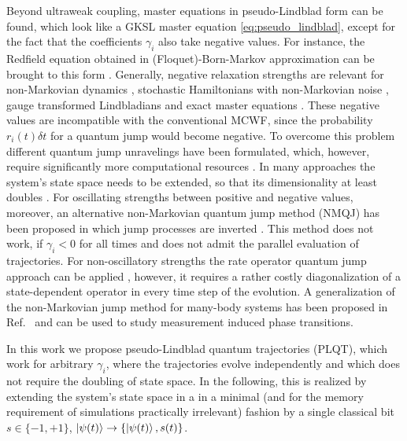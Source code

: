 \documentclass[twocolumn,prl,superscriptaddress]{revtex4-2}
\begin{document}
Beyond ultraweak coupling, master equations in pseudo-Lindblad form can be found, which look like a GKSL master equation \cref{eq:pseudo_lindblad}, except for the fact that the coefficients $\gamma_i$ also take negative values. For instance, the Redfield equation obtained in (Floquet)-Born-Markov approximation can be brought to this form \cite{TBecker2021}. Generally, negative relaxation strengths are relevant for non-Markovian dynamics \cite{DCruscinskiJPiiloWStrunz2017}, stochastic Hamiltonians with non-Markovian noise \cite{Groszkowski2022}, gauge transformed Lindbladians \cite{McDonaldClerk2023arxiv} and exact master equations \cite{KarrleinGrabert97,AShajiECGSudarshan2005,SAlipour2020}. These negative values are incompatible with the conventional MCWF, since the probability $r_i(t) \delta t$ for a quantum jump would become negative. To overcome this problem different quantum jump unravelings have been formulated, which, however, require significantly more computational resources \cite{breuerpetruccione1999,IKondovMschreiber2003,breuer2004,SuessEisfeldStrunz2014,MRHush2015,Piilo2009,KHaerkoenen_2010,KLuoma2020,SmirnePiilo2020}. In many approaches the system’s state space needs to be extended, so that its dimensionality at least doubles \cite{breuerpetruccione1999,IKondovMschreiber2003,breuer2004,ChinRivasHuelgaPlenio2010,SuessEisfeldStrunz2014,MRHush2015,StrasbergSchallerBrandes2016,PolettiSchaller2021}. For oscillating strengths between positive and negative values, moreover, an alternative non-Markovian quantum jump method (NMQJ) has been proposed in which jump processes are inverted \cite{PiiloManiscalco2008,Piilo2009,KHaerkoenen_2010,KLuoma2020}. This method does not work, if $\gamma_i<0$ for all times and does not admit the parallel evaluation of trajectories. For non-oscillatory strengths the rate operator quantum jump approach can be applied \cite{SmirnePiilo2020}, however, it requires a rather costly diagonalization of a state-dependent operator in every time step of the evolution. A generalization of the non-Markovian jump method for many-body systems has been proposed in Ref.~\cite{CGiulianoDPoletti2023} and can be used to study measurement induced phase transitions.

In this work we propose pseudo-Lindblad quantum trajectories (PLQT), which work for arbitrary $\gamma_i$, where the trajectories evolve independently and which does not require the doubling of state space. In the following, this is realized by extending the system’s state space in a in a minimal (and for the memory requirement of simulations practically irrelevant) fashion by a single classical bit $s\in\{-1,+1\}$, $\ket{\psi(t)} \to \{\ket{\psi(t)}, s(t)\}$. 
\end{document}
